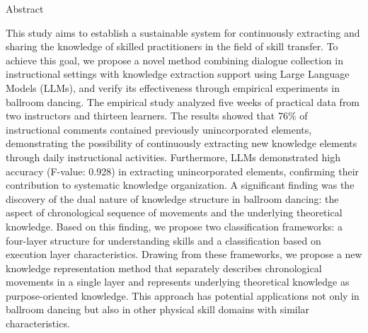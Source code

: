 \centerline{Abstract}
This study aims to establish a sustainable system for continuously extracting and sharing the knowledge of skilled practitioners in the field of skill transfer. To achieve this goal, we propose a novel method combining dialogue collection in instructional settings with knowledge extraction support using Large Language Models (LLMs), and verify its effectiveness through empirical experiments in ballroom dancing.
The empirical study analyzed five weeks of practical data from two instructors and thirteen learners. The results showed that 76\% of instructional comments contained previously unincorporated elements, demonstrating the possibility of continuously extracting new knowledge elements through daily instructional activities. Furthermore, LLMs demonstrated high accuracy (F-value: 0.928) in extracting unincorporated elements, confirming their contribution to systematic knowledge organization.
A significant finding was the discovery of the dual nature of knowledge structure in ballroom dancing: the aspect of chronological sequence of movements and the underlying theoretical knowledge. Based on this finding, we propose two classification frameworks: a four-layer structure for understanding skills and a classification based on execution layer characteristics. Drawing from these frameworks, we propose a new knowledge representation method that separately describes chronological movements in a single layer and represents underlying theoretical knowledge as purpose-oriented knowledge. This approach has potential applications not only in ballroom dancing but also in other physical skill domains with similar characteristics.
\clearpage